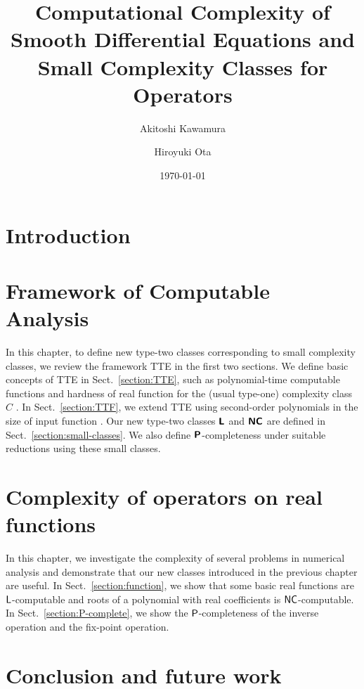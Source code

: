 \documentclass{article}
\title{Computational Complexity of \\ Smooth Differential Equations and \\
 Small Complexity Classes for Operators}
\author{Akitoshi Kawamura \and Hiroyuki Ota}
\date{\today}
\theoremstyle{definition}
\theoremstyle{remark}
\begin{document}
\maketitle

\section{Introduction}


\section{Framework of Computable Analysis}
\label{chapter:computable-analysis}
In this chapter,
to define new type-two classes corresponding to small complexity classes,
we review the framework TTE in the first two sections.
We define basic concepts of TTE in Sect.~\ref{section:TTE},
such as polynomial-time computable functions and hardness of real function
for the (usual type-one) complexity class $C$ \cite{ko1991complexity}.
In Sect.~\ref{section:TTF}, we extend TTE using second-order polynomials
in the size of input function \cite{kawamura2012complexity}.
Our new type-two classes $\text{\bfseries \sffamily \upshape L}$ and $\text{\bfseries \sffamily \upshape NC}$ are defined in Sect.~\ref{section:small-classes}.
We also define $\text{\bfseries \sffamily \upshape P}$-completeness under suitable reductions using these small classes.





\section{Complexity of operators on real functions}
\label{chapter:applications}
In this chapter, we investigate the complexity of several problems in numerical
analysis and demonstrate that our new classes introduced in the previous
chapter are useful.
In Sect.~\ref{section:function}, 
we show that some basic real functions are $\mathsf{L}$-computable and
roots of a polynomial with real coefficients is $\mathsf{NC}$-computable.
In Sect.~\ref{section:P-complete}, we show the $\mathsf{P}$-completeness of 
the inverse operation and the fix-point operation.




\section{Conclusion and future work}
\label{chapter:conclusion}





\end{document}
